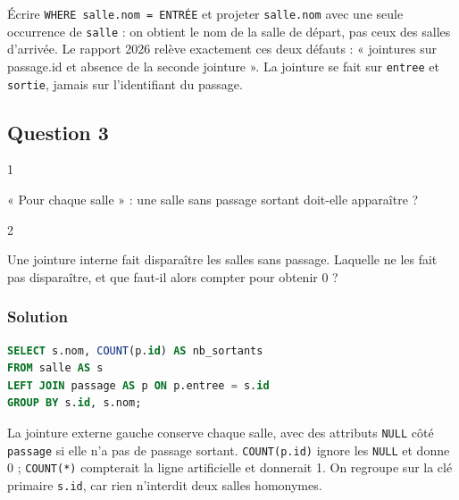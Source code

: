 \documentclass[11pt,a4paper]{article}
\begin{document}
\begin{piege}

Écrire \texttt{WHERE\ salle.nom\ =\allowbreak{}\ \textquotesingle{}ENTRÉE\textquotesingle{}} et projeter \texttt{salle.nom} avec une seule occurrence de \texttt{salle} : on obtient le nom de la salle de départ, pas ceux des salles d'arrivée. Le rapport 2026 relève exactement ces deux défauts : « jointures sur passage.id et absence de la seconde jointure ». La jointure se fait sur \texttt{entree} et \texttt{sortie}, jamais sur l'identifiant du passage.

\end{piege}

\hypertarget{question-3}{%
\subsection{Question 3}\label{question-3}}

\begin{indication}{1}

« Pour chaque salle » : une salle sans passage sortant doit-elle apparaître ?

\end{indication}

\begin{indication}{2}

Une jointure interne fait disparaître les salles sans passage. Laquelle ne les fait pas disparaître, et que faut-il alors compter pour obtenir 0 ?

\end{indication}

\hypertarget{solution-2}{%
\subsubsection{Solution}\label{solution-2}}

\begin{lstlisting}[language=SQL]
SELECT s.nom, COUNT(p.id) AS nb_sortants
FROM salle AS s
LEFT JOIN passage AS p ON p.entree = s.id
GROUP BY s.id, s.nom;
\end{lstlisting}

La jointure externe gauche conserve chaque salle, avec des attributs \texttt{NULL} côté \texttt{passage} si elle n'a pas de passage sortant. \texttt{COUNT(p.id)} ignore les \texttt{NULL} et donne 0 ; \texttt{COUNT(*)} compterait la ligne artificielle et donnerait 1. On regroupe sur la clé primaire \texttt{s.id}, car rien n'interdit deux salles homonymes.
\end{document}
